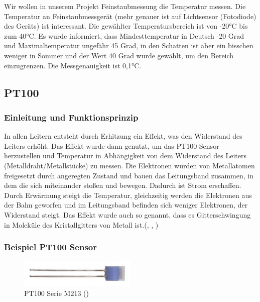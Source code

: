 \documentclass[12pt]{article}
\begin{document}
Wir wollen in unserem Projekt Feinstaubmessung die Temperatur messen. Die Temperatur an Feinstaubmessgerät (mehr genauer ist auf Lichtsensor (Fotodiode) des Geräts) ist interessant. Die gewählter Temperatursbereich ist von -20°C bis zum 40°C. Es wurde informiert, dass Mindesttemperatur in Deutsch -20 Grad und Maximaltemperatur ungefähr 45 Grad, in den Schatten ist aber ein bisschen weniger in Sommer und der Wert 40 Grad wurde gewählt, um den Bereich einzugrenzen. Die Messgenauigkeit ist 0,1°C.

\subsection{PT100}
\subsubsection{Einleitung und Funktionsprinzip}

In allen Leitern entsteht durch Erhitzung ein Effekt, was den Widerstand des Leiters erhöht. Das Effekt wurde dann genutzt, um das PT100-Sensor herzustellen und Temperatur in Abhängigkeit von dem Widerstand des Leiters (Metalldraht/Metallstücke) zu messen. Die Elektronen wurden von Metallatomen freigesetzt durch angeregten Zustand und bauen das Leitungsband zusammen, in dem die sich miteinander stoßen und bewegen. Dadurch ist Strom erschaffen. Durch Erwärmung steigt die Temperatur, gleichzeitig werden die Elektronen aus der Bahn geworfen und im Leitungsband befinden sich weniger Elektronen, der Widerstand steigt. Das Effekt wurde auch so genannt, dass es Gitterschwingung in Moleküle des Kristallgitters von Metall ist.(\cite{Frank.}, \cite{W.GopelJ.HesseJ.N.Zemel.1989}, \cite{L.v.Kortvelyessy.1987})

\subsubsection{Beispiel PT100 Sensor}

\begin{figure}[h]
  \centering
  \label{fig:pt100m213}
  \includegraphics[width=0.5\textwidth]{PT100M213}
  \caption{PT100 Serie M213 (\cite{MouserElectronics.2021c})}
\end{figure}
\end{document}
